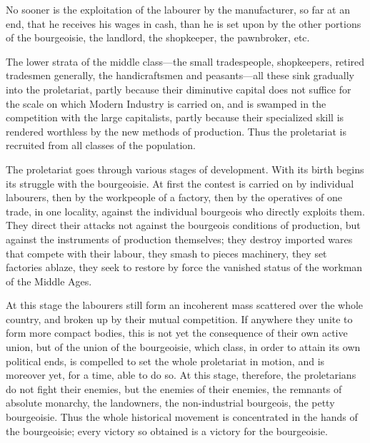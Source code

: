 \documentclass[, oneside]{article}   	%
\begin{document}
No sooner is the exploitation of the labourer by the manufacturer, so far at an end, that he receives his wages in cash, than he is set upon by the other portions of the bourgeoisie, the landlord, the shopkeeper, the pawnbroker, etc.

The lower strata of the middle class—the small tradespeople, shopkeepers, retired tradesmen generally, the handicraftsmen and peasants—all these sink gradually into the proletariat, partly because their diminutive capital does not suffice for the scale on which Modern Industry is carried on, and is swamped in the competition with the large capitalists, partly because their specialized skill is rendered worthless by the new methods of production. Thus the proletariat is recruited from all classes of the population.

The proletariat goes through various stages of development. With its birth begins its struggle with the bourgeoisie. At first the contest is carried on by individual labourers, then by the workpeople of a factory, then by the operatives of one trade, in one locality, against the individual bourgeois who directly exploits them. They direct their attacks not against the bourgeois conditions of production, but against the instruments of production themselves; they destroy imported wares that compete with their labour, they smash to pieces machinery, they set factories ablaze, they seek to restore by force the vanished status of the workman of the Middle Ages.

At this stage the labourers still form an incoherent mass scattered over the whole country, and broken up by their mutual competition. If anywhere they unite to form more compact bodies, this is not yet the consequence of their own active union, but of the union of the bourgeoisie, which class, in order to attain its own political ends, is compelled to set the whole proletariat in motion, and is moreover yet, for a time, able to do so. At this stage, therefore, the proletarians do not fight their enemies, but the enemies of their enemies, the remnants of absolute monarchy, the landowners, the non-industrial bourgeois, the petty bourgeoisie. Thus the whole historical movement is concentrated in the hands of the bourgeoisie; every victory so obtained is a victory for the bourgeoisie.
\end{document}
